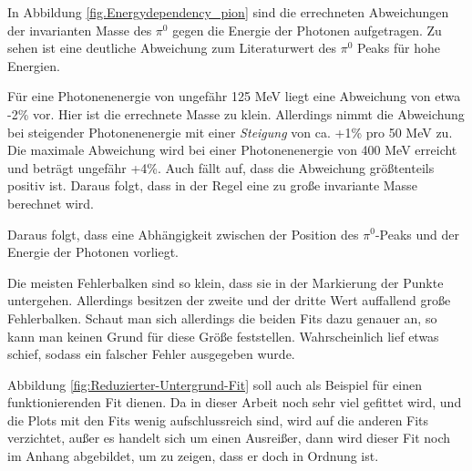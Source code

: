 \documentclass[a4paper,11pt,oneside,final,german,openbib,pdftex]{scrbook}
\begin{document}
{In Abbildung \ref{fig.Energydependency_pion} sind die errechneten Abweichungen der invarianten Masse des $\pi^0$ gegen die Energie der Photonen aufgetragen. Zu sehen ist eine deutliche Abweichung zum Literaturwert des $\pi^0$ Peaks für hohe Energien. 

F\"ur eine Photonenenergie von ungef\"ahr 125 MeV liegt eine Abweichung von etwa -2\% vor. Hier ist die errechnete Masse zu klein. Allerdings nimmt die Abweichung bei steigender Photonenenergie mit einer \textit{Steigung} von ca. +1\% pro 50 MeV zu. Die maximale Abweichung wird bei einer Photonenenergie von 400 MeV erreicht und betr\"agt ungefähr +4\%.
Auch fällt auf, dass die Abweichung größtenteils positiv ist. Daraus folgt, dass in der Regel eine zu gro{\ss}e invariante Masse berechnet wird.

Daraus folgt, dass eine Abhängigkeit zwischen der Position des $\pi^0$-Peaks und der Energie der Photonen vorliegt. 



Die meisten Fehlerbalken sind so klein, dass sie in der Markierung der Punkte untergehen. Allerdings besitzen der zweite und der dritte Wert auffallend große Fehlerbalken. Schaut man sich allerdings die beiden Fits dazu genauer an, so kann man keinen Grund für diese Größe feststellen. Wahrscheinlich lief etwas schief, sodass ein falscher Fehler ausgegeben wurde.

 Abbildung \ref{fig:Reduzierter-Untergrund-Fit} soll auch als Beispiel für einen funktionierenden Fit dienen. Da in dieser Arbeit noch sehr viel gefittet wird, und die Plots mit den Fits wenig aufschlussreich sind, wird auf die anderen Fits verzichtet, außer es handelt sich um einen Ausreißer, dann wird dieser Fit noch im Anhang abgebildet, um zu zeigen, dass er doch in Ordnung ist.



}
\end{document}
